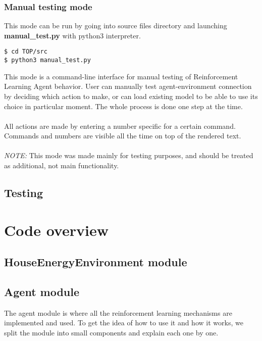 \documentclass{article}
\begin{document}
\subsubsection{Manual testing mode}
This mode can be run by going into source files directory and launching \textbf{manual\_test.py} with python3 interpreter. 
\begin{lstlisting}
$ cd TOP/src
$ python3 manual_test.py
\end{lstlisting}
This mode is a command-line interface for manual testing of Reinforcement Learning Agent behavior. User can manually test agent-environment connection by deciding which action to make, or can load existing model to be able to use its choice in particular moment. The whole process is done one step at the time.\\\\
All actions are made by entering a number specific for a certain command. Commands and numbers are visible all the time on top of the rendered text. \\\\
\textit{NOTE:} This mode was made mainly for testing purposes, and should be treated as additional, not main functionality.

\subsection{Testing}
\section{Code overview}
\subsection{HouseEnergyEnvironment module}

\subsection{Agent module}
The agent module is where all the reinforcement learning mechanisms are implemented and used. To get the idea of how to use it and how it works, we split the module into small components and explain each one by one.
\end{document}
